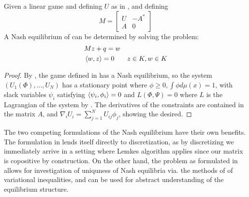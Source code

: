 \begin{corollary}
	\label{cor:gen_nash_eq}
	Given a linear game  and defining $U$ as in , and defining
	\begin{equation}
	M=
		\begin{bmatrix}
			U & -A^* \\
			A & 0
		\end{bmatrix}
	\end{equation}
  A Nash equilibrium of  can be determined by solving the problem:
	\begin{align*}
		&Mz+q=w \\
		&\left \langle w,z \right \rangle = 0
		&z \in K, w\in K
	\end{align*}
\end{corollary}
\begin{proof}
	By , the game defined in  has a Nash equilibrium, so the system $(U_1(\Phi), \dots, U_{N})$ has a stationary point where $\phi \geq 0, \int \phi d\mu(x)= 1$, with slack variables $\psi_i$ satisfying $\ip{\psi_i}{\phi_i} = 0$ and $L(\Phi, \Psi) = 0$ where $L$ is the Lagrangian of the system by \citep[p. 286]{handbookofglobaloptimization}.
	The derivatives of the constraints are contained in the matrix $A$, and  $\nabla_i U_i = \sum_{j=1}^N U_{ij}\phi_j$, showing the desired.
\end{proof}
The two competing formulations of the Nash equilibrium have their own benefits. The formulation in  lends itself directly to discretization, as by discretizing we immediately arrive in a setting where Lemkes algorithm applies since our matrix is copositive by construction. On the other hand, the problem as formulated in  allows for investigation of uniquness of Nash equilibria via. the methods of of variational inequalities, and can be used for abstract understanding of the equilibrium structure.

\begin{comment}
@article{craven1977generalizations,
  title={Generalizations of Farkas’ theorem},
  author={Craven, Bruce Desmond and Koliha, Jaromir Joseph},
  journal={SIAM Journal on Mathematical Analysis},
  volume={8},
  number={6},
  pages={983--997},
  year={1977},
  publisher={SIAM}
}
(5)
@article{glicksberg1952further,
  title={A further generalization of the Kakutani fixed point theorem, with application to Nash equilibrium points},
  author={Glicksberg, Irving L},
  journal={Proceedings of the American Mathematical Society},
  volume={3},
  number={1},
  pages={170--174},
  year={1952},
  publisher={JSTOR}
}
(2)


@article{goeleven1993solvability,
  title={On the solvability of noncoercive linear variational inequalities in separable Hilbert spaces},
  author={Goeleven, D},
  journal={Journal of Optimization Theory and Applications},
  volume={79},
  number={3},
  pages={493--511},
  year={1993},
  publisher={Springer}
}
\end{comment}
